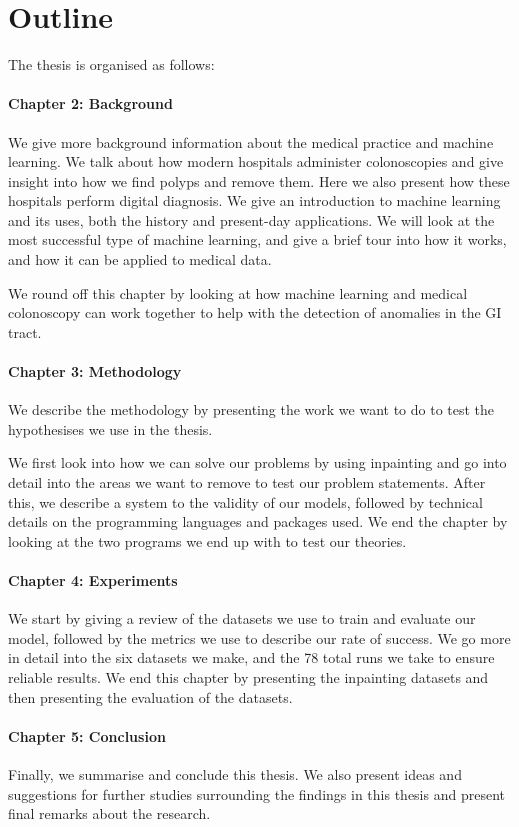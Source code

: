 \section{Outline}
The thesis is organised as follows:

\paragraph{Chapter 2: Background}
We give more background information about the medical practice and machine learning.
We talk about how modern hospitals administer colonoscopies and give insight into how we find polyps and remove them. Here we also present how these hospitals perform digital diagnosis.  
We give an introduction to machine learning and its uses, both the history and present-day applications. We will look at the most successful type of machine learning, and give a brief tour into how it works, and how it can be applied to medical data.

We round off this chapter by looking at how machine learning and medical colonoscopy can work together to help with the detection of anomalies in the GI tract.

\paragraph{Chapter 3: Methodology }
We describe the methodology by presenting the work we want to do to test the hypothesises we use in the thesis.

We first look into how we can solve our problems by using inpainting and go into detail into the areas we want to remove to test our problem statements. 
After this, we describe a system to the validity of our models, followed by technical details on the programming languages and packages used.
We end the chapter by looking at the two programs we end up with to test our theories. 


\paragraph{Chapter 4: Experiments}
We start by giving a review of the datasets we use to train and evaluate our model, followed by the metrics we use to describe our rate of success.
We go more in detail into the six datasets we make, and the 78 total runs we take to ensure reliable results.
We end this chapter by presenting the inpainting datasets and then presenting the evaluation of the datasets.


\paragraph{Chapter 5: Conclusion}
Finally, we summarise and conclude this thesis.
We also present ideas and suggestions for further studies surrounding
the findings in this thesis and present final remarks about the research.

